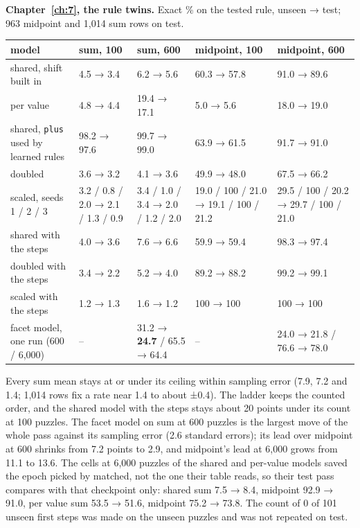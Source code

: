 \textbf{Chapter~\ref{ch:7}, the rule twins.} Exact \% on the tested rule, unseen → test; 963 midpoint and 1,014 sum rows on test.

\begin{center}\small
\begin{tabularx}{\linewidth}{@{}YYYYY@{}}
\toprule
model & sum, 100 & sum, 600 & midpoint, 100 & midpoint, 600 \\
\midrule
shared, shift built in & 4.5 → 3.4 & 6.2 → 5.6 & 60.3 → 57.8 & 91.0 → 89.6 \\
per value & 4.8 → 4.4 & 19.4 → 17.1 & 5.0 → 5.6 & 18.0 → 19.0 \\
shared, \texttt{plus} used by learned rules & 98.2 → 97.6 & 99.7 → 99.0 & 63.9 → 61.5 & 91.7 → 91.0 \\
doubled & 3.6 → 3.2 & 4.1 → 3.6 & 49.9 → 48.0 & 67.5 → 66.2 \\
scaled, seeds 1 / 2 / 3 & 3.2 / 0.8 / 2.0 → 2.1 / 1.3 / 0.9 & 3.4 / 1.0 / 3.4 → 2.0 / 1.2 / 2.0 & 19.0 / 100 / 21.0 → 19.1 / 100 / 21.2 & 29.5 / 100 / 20.2 → 29.7 / 100 / 21.0 \\
shared with the steps & 4.0 → 3.6 & 7.6 → 6.6 & 59.9 → 59.4 & 98.3 → 97.4 \\
doubled with the steps & 3.4 → 2.2 & 5.2 → 4.0 & 89.2 → 88.2 & 99.2 → 99.1 \\
scaled with the steps & 1.2 → 1.3 & 1.6 → 1.2 & 100 → 100 & 100 → 100 \\
facet model, one run (600 / 6,000) & – & 31.2 → \textbf{24.7} / 65.5 → 64.4 & – & 24.0 → 21.8 / 76.6 → 78.0 \\
\bottomrule
\end{tabularx}
\end{center}

Every sum mean stays at or under its ceiling within sampling error (7.9, 7.2 and 1.4; 1,014 rows fix a rate near 1.4 to about ±0.4). The ladder keeps the counted order, and the shared model with the steps stays about 20 points under its count at 100 puzzles. The facet model on sum at 600 puzzles is the largest move of the whole pass against its sampling error (2.6 standard errors); its lead over midpoint at 600 shrinks from 7.2 points to 2.9, and midpoint's lead at 6,000 grows from 11.1 to 13.6. The cells at 6,000 puzzles of the shared and per-value models saved the epoch picked by matched, not the one their table reads, so their test pass compares with that checkpoint only: shared sum 7.5 → 8.4, midpoint 92.9 → 91.0, per value sum 53.5 → 51.6, midpoint 75.2 → 73.8. The count of 0 of 101 unseen first steps was made on the unseen puzzles and was not repeated on test.

